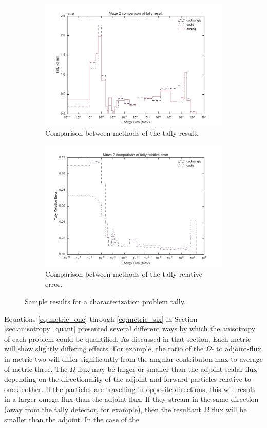 \begin{figure}[ht!]
  \centering
  \begin{subfigure}[t]{\textwidth}
    \centering
    \includegraphics[width=0.8\linewidth]{./chapters/characterization_probs/figures/char/maze2/maze_2_tally_result_compare.pdf}
    \caption{Comparison between methods of the tally result.}
    \label{fig:sampleresult}
  \end{subfigure}
  \begin{subfigure}[t]{\textwidth}
    \centering
    \includegraphics[width=0.8\linewidth]{./chapters/characterization_probs/figures/char/maze2/maze_2_tally_error_compare.pdf}
    \caption{Comparison between methods of the tally relative error.}
    \label{fig:sampleerror}
  \end{subfigure}
  \caption[Sample results for a characterization problem tally.]{Sample results
  for a characterization problem tally.}
\end{figure}

Equations \eqref{eq:metric_one} through \eqref{eq:metric_six} in
Section \ref{sec:anisotropy_quant} presented several different ways by which the
anisotropy of each problem could be quantified. As discussed in that section,
Each metric will show slightly differing effects. For example, the ratio of the
$\Omega$- to adjoint-flux in metric two will differ significantly from the
angular contributon max to average of metric three. The $\Omega$-flux
may be larger or smaller than the adjoint scalar flux depending on the
directionality of the adjoint and forward particles relative to one another. If
the particles are travelling in opposite directions, this will result in a
larger omega flux than the adjoint flux. If they stream in the same direction
(away from the tally detector, for example),
then the resultant $\Omega$ flux will be smaller than the adjoint. In the case
of the

